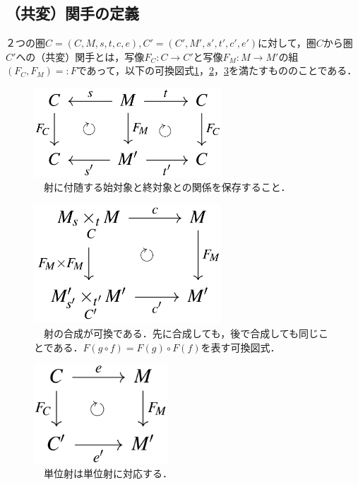 \documentclass[uplatex, 12pt, a4paper, dvipdfmx]{jsarticle}
\begin{document}
\subsection{（共変）関手の定義}

\begin{shadebox}\begin{definition}[（共変）関手]
    ２つの圏$C=(C,M,s,t,c,e),C'=(C',M',s',t',c',e')$に対して，圏$C$から圏$C'$への（共変）関手とは，写像$F_C:C\longrightarrow C'$と写像$F_M:M\longrightarrow M'$の組$(F_C,F_M)=:F$であって，以下の可換図式\ref{cd-5}，\ref{cd-6}，\ref{cd-7}を満たすもののことである．
\end{definition}\end{shadebox}

\begin{figure}[ht]\begin{center} \caption{\label{cd-5}　射に付随する始対象と終対象との関係を保存すること．}
    \includegraphics[width=7cm]{cd-5.png}
\end{center}\end{figure}

\begin{figure}[ht]\begin{center} \caption{\label{cd-6}　射の合成が可換である．先に合成しても，後で合成しても同じことである．$F(g\circ f)=F(g)\circ F(f)$を表す可換図式．}
    \includegraphics[width=7cm]{cd-6.png}
\end{center}\end{figure}

\begin{figure}[ht]\begin{center} \caption{\label{cd-7}　単位射は単位射に対応する．}
    \includegraphics[width=5cm]{cd-7.png}
\end{center}\end{figure}
\end{document}

